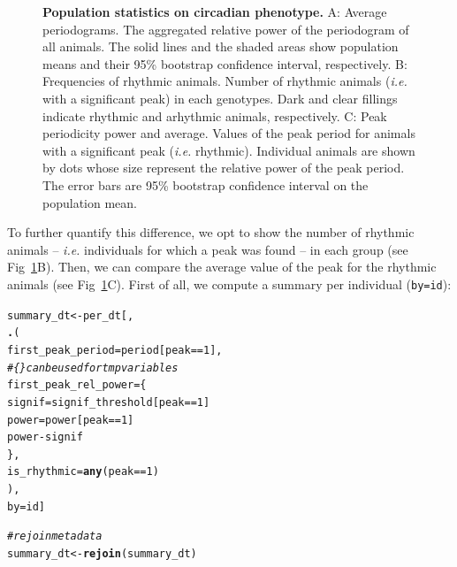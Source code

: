 \documentclass[10pt,letterpaper]{article}\usepackage[]{graphicx}\usepackage[]{color}
\makeatletter
\newcommand{\hlnum}[1]{\textcolor[rgb]{0.686,0.059,0.569}{#1}}%
\newcommand{\hlcom}[1]{\textcolor[rgb]{0.678,0.584,0.686}{\textit{#1}}}%
\newcommand{\hlopt}[1]{\textcolor[rgb]{0,0,0}{#1}}%
\newcommand{\hlstd}[1]{\textcolor[rgb]{0.345,0.345,0.345}{#1}}%
\newcommand{\hlkwb}[1]{\textcolor[rgb]{0.69,0.353,0.396}{#1}}%
\newcommand{\hlkwc}[1]{\textcolor[rgb]{0.333,0.667,0.333}{#1}}%
\newcommand{\hlkwd}[1]{\textcolor[rgb]{0.737,0.353,0.396}{\textbf{#1}}}%
\newenvironment{kframe}{%
 \def\at@end@of@kframe{}%
 \ifinner\ifhmode%
  \def\at@end@of@kframe{\end{minipage}}%
  \begin{minipage}{\columnwidth}%
 \fi\fi%
 \def\FrameCommand##1{\hskip\@totalleftmargin \hskip-\fboxsep
 \colorbox{shadecolor}{##1}\hskip-\fboxsep
     \hskip-\linewidth \hskip-\@totalleftmargin \hskip\columnwidth}%
 \MakeFramed {\advance\hsize-\width
   \@totalleftmargin\z@ \linewidth\hsize
   \@setminipage}}%
 {\par\unskip\endMakeFramed%
 \at@end@of@kframe}
\newenvironment{knitrout}{}{} %
\makeatother
\begin{document}
\begin{figure}[!h]
	\caption{{\bf Population statistics on circadian phenotype.}
			A: Average periodograms. 
			      The aggregated relative power of the periodogram of all animals.
			      The solid lines and the shaded areas show population means and their 95\% bootstrap confidence interval, respectively.
			B: Frequencies of rhythmic animals.
			      Number of rhythmic animals (\emph{i.e.} with a significant peak) in each genotypes.
			      Dark and clear fillings indicate rhythmic and arhythmic animals, respectively.
      C: Peak periodicity power and average.
			      Values of the peak period for animals with a significant peak (\emph{i.e.} rhythmic).
			      Individual animals are shown by dots whose size represent the relative power of the peak period.
			      The error bars are 95\% bootstrap confidence interval on the population mean.
			      }
	\label{fig:fig-5}
\end{figure}


To further quantify this difference, we opt to show the number of rhythmic animals -- \emph{i.e.} individuals for which a peak was found -- in each group (see Fig~\ref{fig:fig-5}B).
Then, we can compare the average value of the peak for the rhythmic animals (see Fig~\ref{fig:fig-5}C).
First of all, we compute a summary per individual (\texttt{by=id}):

\begin{knitrout}
\color{fgcolor}\begin{kframe}
\begin{alltt}
\hlstd{summary_dt} \hlkwb{<-} \hlstd{per_dt[,}
                \hlkwd{.}\hlstd{(}
                  \hlkwc{first_peak_period} \hlstd{= period[peak} \hlopt{==} \hlnum{1}\hlstd{],}
                  \hlcom{# \{\} can be used for tmp variables}
                  \hlkwc{first_peak_rel_power} \hlstd{= \{}
                    \hlstd{signif} \hlkwb{=} \hlstd{signif_threshold[peak} \hlopt{==} \hlnum{1}\hlstd{]}
                    \hlstd{power} \hlkwb{=} \hlstd{power[peak} \hlopt{==} \hlnum{1}\hlstd{]}
                    \hlstd{power} \hlopt{-} \hlstd{signif}
                  \hlstd{\},}
                  \hlkwc{is_rhythmic} \hlstd{=} \hlkwd{any}\hlstd{(peak} \hlopt{==} \hlnum{1}\hlstd{)}
                \hlstd{),}
                \hlkwc{by}\hlstd{=id]}

\hlcom{# rejoin metadata}
\hlstd{summary_dt} \hlkwb{<-} \hlkwd{rejoin}\hlstd{(summary_dt)}
\end{alltt}
\end{kframe}
\end{knitrout}
\end{document}
